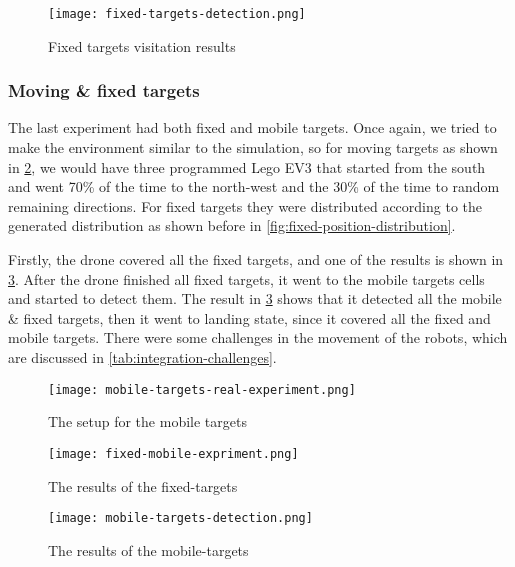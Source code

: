 \documentclass[../main.tex]{subfiles}
\begin{document}
\begin{figure}[H]
	\centering
	\texttt{[image: fixed-targets-detection.png]}
	\caption{Fixed targets visitation results}
	\label{fig:fixed-location-detection-camera}
\end{figure}

\subsubsection{Moving \& fixed targets}

The last experiment had both fixed and mobile targets.
Once again, we tried to make the environment similar to the 
simulation, so for moving targets as shown in 
\cref{fig:mobile-targets-real-experiment}, we would have 
three programmed Lego EV3 that started
from the south and went 70\% of the time to the north-west 
and the 30\% of the time to random remaining directions. For fixed
targets they were distributed according to the generated distribution
as shown before in \cref{fig:fixed-position-distribution}.

Firstly, the drone covered all the fixed targets, and one of the 
results is shown in \cref{fig:fixed-mobile-experiment}. After the 
drone finished all fixed targets, it went to the mobile targets cells and
started to detect them. The result in \cref{fig:fixed-mobile-experiment} 
shows that it detected all the mobile \& fixed targets, 
then it went to landing state, since it covered all the fixed and mobile targets.
There were some challenges in the movement of the robots, which are 
discussed in \cref{tab:integration-challenges}.

\begin{figure}[H]
	\centering
	\texttt{[image: mobile-targets-real-experiment.png]}
	\caption{The setup for the mobile targets}
	\label{fig:mobile-targets-real-experiment}
\end{figure}

\begin{figure}[H]
	\centering
	\texttt{[image: fixed-mobile-expriment.png]}
	\caption{The results of the fixed-targets}
	\label{fig:fixed-mobile-experiment}
\end{figure}

\begin{figure}[H]
	\centering
	\texttt{[image: mobile-targets-detection.png]}
	\caption{The results of the mobile-targets}
	\label{fig:mobile-expriment-detection}
\end{figure}
\end{document}
